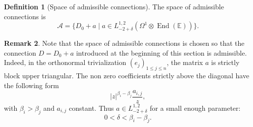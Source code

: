 \documentclass[11pt]{article}
\theoremstyle{definition}
\newtheorem{definition}{Definition}[section]
\newtheorem{remark}[definition]{Remark}
\theoremstyle{plain}
\DeclareMathOperator{\End}{End}
\begin{document}
\begin{definition}[Space of admissible connections]\label{def_admissible_connections_loc}
The space of admissible connections is
\[
\mathcal{A} =\lbrace D_0+a \mid a \in L^{1,2}_{-2+\delta}(\Omega^1\otimes \End (\mathbb{E}))\rbrace.
\]
\end{definition}
\begin{remark}
Note that the space of admissible connections is chosen so that the connection $D=D_0+a$ introduced at the beginning of this section is admissible. Indeed, in the orthonormal trivialization $\left(e_j\right)_{1\le j \le n}$, the matrix $a$ is strictly block upper triangular. The non zero coefficients strictly above the diagonal have the following form
\[
|z|^{\beta_i-\beta_j} \frac{a_{i,j}}{z},
\]
with $\beta_i > \beta_j$ and $a_{i,j}$ constant. Thus $a\in L^{1,2}_{-2+\delta}$ for a small enough parameter:
\[
0<\delta < \beta_i-\beta_j.
\]
\end{remark}
\end{document}
